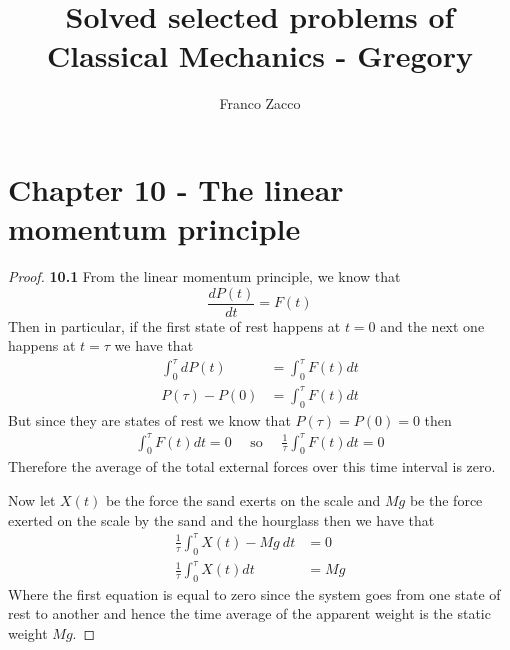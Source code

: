 \documentclass[11pt]{article}
\title{\textbf{Solved selected problems of Classical Mechanics - Gregory}}
\author{Franco Zacco}
\date{}
\theoremstyle{definition}
\begin{document}
\maketitle
\thispagestyle{empty}

\section*{Chapter 10 - The linear momentum principle}

	\begin{proof}{\textbf{10.1}}
        From the linear momentum principle, we know that 
        $$\frac{dP(t)}{dt} = F(t)$$
        Then in particular, if the first state of rest happens at $t=0$ and
        the next one happens at $t=\tau$ we have that
        \begin{align*}
            \int_0^\tau dP(t) &= \int_0^\tau F(t) dt\\
            P(\tau) - P(0) &= \int_0^\tau F(t) dt
        \end{align*}
        But since they are states of rest we know that $P(\tau) = P(0) = 0$
        then
        \begin{align*}
            \int_0^\tau F(t) dt = 0 \quad\text{ so }\quad
            \frac{1}{\tau}\int_0^\tau F(t) dt = 0
        \end{align*}
        Therefore the average of the total external forces over this time
        interval is zero.

        Now let $X(t)$ be the force the sand exerts on the scale and $Mg$ be
        the force exerted on the scale by the sand and the hourglass then
        we have that
        \begin{align*}
            \frac{1}{\tau}\int_0^\tau X(t) - Mg~dt &= 0\\
            \frac{1}{\tau}\int_0^\tau X(t)dt &= Mg
        \end{align*}
        Where the first equation is equal to zero since the system goes from
        one state of rest to another and hence the time average of the apparent
        weight is the static weight $Mg$. 
    \end{proof}
\cleardoublepage
\end{document}
